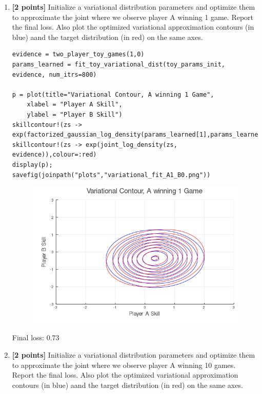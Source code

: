 \documentclass{article}
\begin{document}
\begin{enumerate}[label=(\alph*)]
    \pagebreak
    
  \item {\bf [2 points]} Initialize a variational distribution parameters and optimize them to approximate the joint
    where we observe player A winning 1 game.
    Report the final loss.
    Also plot the optimized variational approximation contours (in blue) aand the target distribution (in red) on the same axes.

\begin{verbatim}
evidence = two_player_toy_games(1,0)
params_learned = fit_toy_variational_dist(toy_params_init, evidence, num_itrs=800)

p = plot(title="Variational Contour, A winning 1 Game",
    xlabel = "Player A Skill",
    ylabel = "Player B Skill")
skillcontour!(zs -> exp(factorized_gaussian_log_density(params_learned[1],params_learned[2],zs)),colour=:blue)
skillcontour!(zs -> exp(joint_log_density(zs, evidence)),colour=:red)
display(p);
savefig(joinpath("plots","variational_fit_A1_B0.png"))
\end{verbatim}

\begin{figure}[h]
  \centering
  \includegraphics[width=12cm,keepaspectratio]{plots/variational_fit_A1_B0.png}
\end{figure}

Final loss: 0.73
\pagebreak

  \item {\bf [2 points]} Initialize a variational distribution parameters and optimize them to approximate the joint
    where we observe player A winning 10 games.
    Report the final loss.
    Also plot the optimized variational approximation contours (in blue) aand the target distribution (in red) on the same axes.


\end{enumerate}
\end{document}
